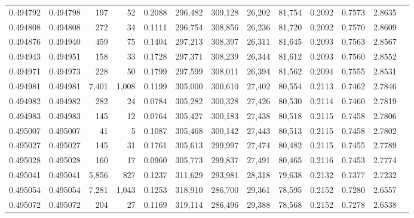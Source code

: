 \begin{tabular}{rrrrrrrrrrrrr}
0.494792 & 0.494798 &   197 &    52 &                                     0.2088 & 296,482 & 309,128 &  26,202 &  81,754 & 0.2092 & 0.7573 & 2.8635 \\
0.494808 & 0.494808 &   272 &    34 &                                     0.1111 & 296,754 & 308,856 &  26,236 &  81,720 & 0.2092 & 0.7570 & 2.8609 \\
0.494876 & 0.494940 &   459 &    75 &                                     0.1404 & 297,213 & 308,397 &  26,311 &  81,645 & 0.2093 & 0.7563 & 2.8567 \\
0.494943 & 0.494951 &   158 &    33 &                                     0.1728 & 297,371 & 308,239 &  26,344 &  81,612 & 0.2093 & 0.7560 & 2.8552 \\
0.494971 & 0.494973 &   228 &    50 &                                     0.1799 & 297,599 & 308,011 &  26,394 &  81,562 & 0.2094 & 0.7555 & 2.8531 \\
0.494981 & 0.494981 & 7,401 & 1,008 &                                     0.1199 & 305,000 & 300,610 &  27,402 &  80,554 & 0.2113 & 0.7462 & 2.7846 \\
0.494982 & 0.494982 &   282 &    24 &                                     0.0784 & 305,282 & 300,328 &  27,426 &  80,530 & 0.2114 & 0.7460 & 2.7819 \\
0.494983 & 0.494983 &   145 &    12 &                                     0.0764 & 305,427 & 300,183 &  27,438 &  80,518 & 0.2115 & 0.7458 & 2.7806 \\
0.495007 & 0.495007 &    41 &     5 &                                     0.1087 & 305,468 & 300,142 &  27,443 &  80,513 & 0.2115 & 0.7458 & 2.7802 \\
0.495027 & 0.495027 &   145 &    31 &                                     0.1761 & 305,613 & 299,997 &  27,474 &  80,482 & 0.2115 & 0.7455 & 2.7789 \\
0.495028 & 0.495028 &   160 &    17 &                                     0.0960 & 305,773 & 299,837 &  27,491 &  80,465 & 0.2116 & 0.7453 & 2.7774 \\
0.495041 & 0.495041 & 5,856 &   827 &                                     0.1237 & 311,629 & 293,981 &  28,318 &  79,638 & 0.2132 & 0.7377 & 2.7232 \\
0.495054 & 0.495054 & 7,281 & 1,043 &                                     0.1253 & 318,910 & 286,700 &  29,361 &  78,595 & 0.2152 & 0.7280 & 2.6557 \\
0.495072 & 0.495072 &   204 &    27 &                                     0.1169 & 319,114 & 286,496 &  29,388 &  78,568 & 0.2152 & 0.7278 & 2.6538 \\

\end{tabular}
